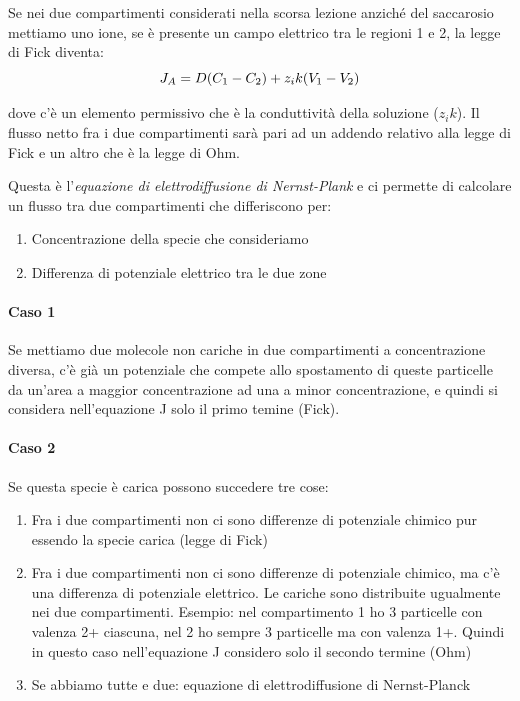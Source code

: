 \documentclass[a4paper,12pt]{article}
\begin{document}
Se nei due compartimenti considerati nella scorsa lezione anziché del saccarosio mettiamo uno ione, se è presente un campo elettrico tra le regioni 1 e 2, la legge di Fick diventa:
\begin{equation}
\centering
J_{A} = D(C_{1}-C_{2}) + z_{i}k(V_{1}-V_{2}) 		
\end{equation}

dove c'è un elemento permissivo che è la conduttività della soluzione ($z_{i}k$). Il flusso netto fra i due compartimenti sarà pari ad un addendo relativo alla legge di Fick e un altro che è la legge di Ohm.

Questa è l'\emph{equazione di elettrodiffusione di Nernst-Plank} e ci permette di calcolare un flusso tra due compartimenti che differiscono per:
\begin{enumerate}
\item{Concentrazione della specie che consideriamo}
\item{Differenza di potenziale elettrico tra le due zone}
\end{enumerate}

\paragraph{Caso 1}
Se mettiamo due molecole non cariche in due compartimenti a concentrazione diversa, c'è già un potenziale che compete allo spostamento di queste particelle da un'area a maggior concentrazione ad una a minor concentrazione,  e quindi
si considera nell’equazione J solo il primo temine (Fick).

\paragraph{Caso 2}
Se questa specie è carica possono succedere tre cose:
\begin{enumerate}
\item{Fra i due compartimenti non ci sono differenze di potenziale chimico pur essendo la specie carica (legge di Fick)}
\item{Fra i due compartimenti non ci sono differenze di potenziale chimico, ma c’è una differenza di potenziale elettrico. Le cariche sono distribuite ugualmente nei due compartimenti.
Esempio: nel compartimento 1 ho 3 particelle con valenza 2+ ciascuna, nel 2 ho sempre 3
particelle ma con valenza 1+.
Quindi in questo caso nell’equazione J considero solo il secondo termine (Ohm)}
\item{Se abbiamo tutte e due: equazione di elettrodiffusione di Nernst-Planck}
\end{enumerate}
\end{document}
